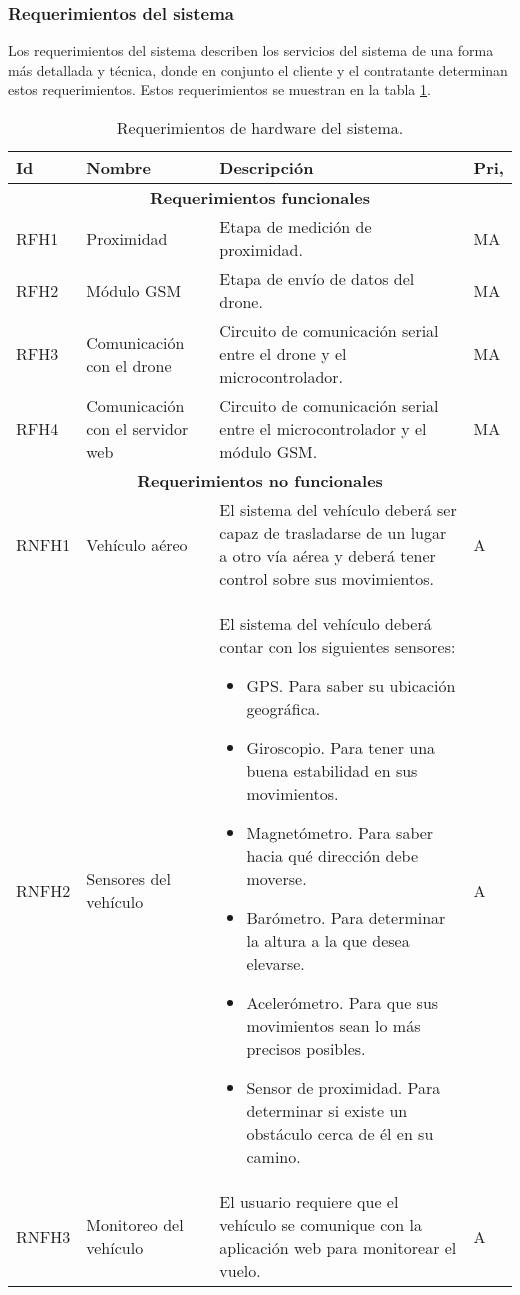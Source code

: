 %

\subsubsection{Requerimientos del sistema}

Los requerimientos del sistema describen los servicios del sistema de una forma 
más detallada y técnica, donde en conjunto el cliente y el contratante 
determinan estos requerimientos. Estos requerimientos se muestran en la tabla 
\ref{tab:req:hard:sistema}.

\begin{table}[H]
	\centering
	\caption{Requerimientos de hardware del sistema.}
	\label{tab:req:hard:sistema}
	\begin{tabular}{ | l | l | p{6.5cm} | l |}
		\hline
		\textbf{Id} & \textbf{Nombre} & \textbf{Descripción} & 
		\textbf{Pri,}
		\\\hline
		\multicolumn{4}{|c|}{\textbf{Requerimientos funcionales}} 
		\\\hline
		RFH1 & Proximidad & Etapa de medición de proximidad. 
		& MA
		\\\hline
		RFH2 & Módulo GSM & Etapa de envío de datos del drone.
		& MA
		\\\hline
		RFH3 & Comunicación con el drone & Circuito de comunicación 
		serial entre el drone y el microcontrolador.
		& MA
		\\\hline
		RFH4 & Comunicación con el servidor web & Circuito de 
		comunicación serial entre el microcontrolador y el módulo GSM.
		& MA
		\\\hline
		\multicolumn{4}{|c|}{\textbf{Requerimientos no funcionales}} 
		\\\hline
		RNFH1 & Vehículo aéreo & El sistema del vehículo deberá ser 
		capaz de trasladarse de un lugar a otro vía aérea y deberá tener 
		control sobre sus movimientos. & A
		\\\hline
		RNFH2 & Sensores del vehículo & El sistema del vehículo deberá 
		contar con los siguientes sensores:
		\begin{itemize}
		\item GPS. Para saber su ubicación geográfica.
		\item Giroscopio. Para tener una buena estabilidad en sus 
		movimientos.
		\item Magnetómetro. Para saber hacia qué dirección debe moverse.
		\item Barómetro. Para determinar la altura a la que desea 
		elevarse.
		\item Acelerómetro. Para que sus movimientos sean lo más 
		precisos posibles.
		\item Sensor de proximidad. Para determinar si existe un 
		obstáculo cerca de él en su camino.
		\end{itemize}
		& A
		\\\hline
		RNFH3 & Monitoreo del vehículo & El usuario requiere que el 
		vehículo se comunique con la aplicación web para monitorear el 
		vuelo. & A
		\\\hline
	\end{tabular}
\end{table}
